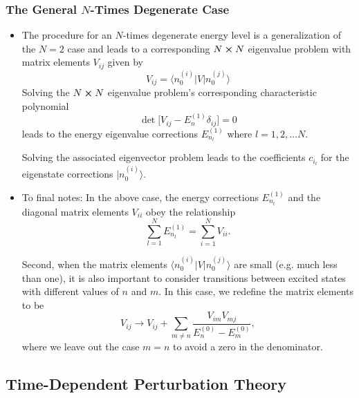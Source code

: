 \documentclass[11pt, a4paper]{article}
\newcommand{\bket}[1]{\big | {#1} \big \rangle }
\newcommand{\bmel}[3]{\big \langle {#1} \big | {#2} \big | {#3} \big \rangle}  %
\begin{document}
\subsubsection{The General $ N $-Times Degenerate Case}
\begin{itemize}
    \item The procedure for an $ N $-times degenerate energy level is a generalization of the $ N = 2 $ case and leads to a corresponding $ N \cross N $ eigenvalue problem with matrix elements $ V_{ij} $ given by
    \begin{equation*}
        V_{ij} = \bmel{n_{0}^{(i)}}{V}{n_{0}^{(j)}}
    \end{equation*}
    Solving the $ N \cross N $ eigenvalue problem's corresponding characteristic polynomial
    \begin{equation*}
        \det \big[ V_{ij} - E_{n}^{(1)}\delta_{ij} \big] = 0
    \end{equation*}
    leads to the energy eigenvalue corrections $ E_{n_{l}}^{(1)} $ where $ l = 1, 2, \ldots N $. 

    Solving the associated eigenvector problem leads to the coefficients $ c_{i_{l}} $ for the eigenstate corrections $ \bket{n_{0}^{(i)}} $.
    
    \item To final notes: In the above case, the energy corrections $ E_{n_{l}}^{(1)} $ and the diagonal matrix elements $ V_{ii} $ obey the relationship
    \begin{equation*}
        \sum_{l = 1}^{N} E_{n_{l}}^{(1)} = \sum_{i = 1}^{N}V_{ii}.
    \end{equation*}
    
    Second, when the matrix elements $ \bmel{n_{0}^{(i)}}{V}{n_{0}^{(j)}} $ are small (e.g. much less than one), it is also important to consider transitions between excited states with different values of $ n $ and $ m $. In this case, we redefine the matrix elements to be
    \begin{equation*}
        V_{ij} \to V_{ij} + \sum_{m\neq n} \frac{V_{im}V_{mj}}{E_{n}^{(0)} - E_{m}^{(0)}},
    \end{equation*}
    where we leave out the case $ m = n $ to avoid a zero in the denominator.
    
\end{itemize}

\subsection{Time-Dependent Perturbation Theory}
\end{document}
